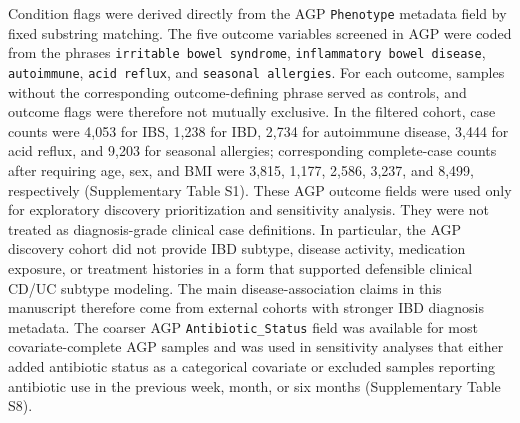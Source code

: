 \documentclass[
  11pt,
]{article}
\begin{document}
Condition flags were derived directly from the AGP \texttt{Phenotype}
metadata field by fixed substring matching. The five outcome variables
screened in AGP were coded from the phrases
\texttt{irritable bowel syndrome},
\texttt{inflammatory bowel disease}, \texttt{autoimmune},
\texttt{acid reflux}, and \texttt{seasonal allergies}. For each outcome,
samples without the corresponding outcome-defining phrase served as
controls, and outcome flags were therefore not mutually exclusive. In
the filtered cohort, case counts were 4,053 for IBS, 1,238 for IBD,
2,734 for autoimmune disease, 3,444 for acid reflux, and 9,203 for
seasonal allergies; corresponding complete-case counts after requiring
age, sex, and BMI were 3,815, 1,177, 2,586, 3,237, and 8,499,
respectively (Supplementary Table S1). These AGP outcome fields were
used only for exploratory discovery prioritization and sensitivity
analysis. They were not treated as diagnosis-grade clinical case
definitions.
In particular, the AGP discovery cohort did not provide IBD subtype,
disease activity, medication exposure, or treatment histories in a form
that supported defensible clinical CD/UC subtype modeling. The main
disease-association claims in this manuscript therefore come from
external cohorts with stronger IBD diagnosis metadata. The coarser AGP
\texttt{Antibiotic\_Status} field was available for most
covariate-complete AGP samples and was used in sensitivity analyses that
either added antibiotic status as a categorical covariate or excluded
samples reporting antibiotic use in the previous week, month, or six
months (Supplementary Table S8).
\end{document}
